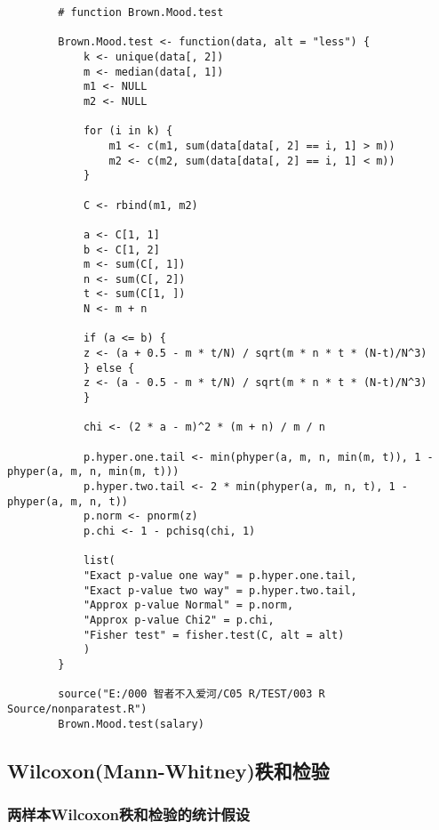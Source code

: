 \documentclass[UTF8]{ctexart}
\numberwithin{equation}{section}
\begin{document}
\begin{center}
    \begin{lstlisting}
        # function Brown.Mood.test

        Brown.Mood.test <- function(data, alt = "less") {
            k <- unique(data[, 2])
            m <- median(data[, 1])
            m1 <- NULL
            m2 <- NULL
        
            for (i in k) {
                m1 <- c(m1, sum(data[data[, 2] == i, 1] > m))
                m2 <- c(m2, sum(data[data[, 2] == i, 1] < m))
            }
        
            C <- rbind(m1, m2)
        
            a <- C[1, 1]
            b <- C[1, 2]
            m <- sum(C[, 1])
            n <- sum(C[, 2])
            t <- sum(C[1, ])
            N <- m + n
        
            if (a <= b) {
            z <- (a + 0.5 - m * t/N) / sqrt(m * n * t * (N-t)/N^3)
            } else {
            z <- (a - 0.5 - m * t/N) / sqrt(m * n * t * (N-t)/N^3)
            }
        
            chi <- (2 * a - m)^2 * (m + n) / m / n
            
            p.hyper.one.tail <- min(phyper(a, m, n, min(m, t)), 1 - phyper(a, m, n, min(m, t)))
            p.hyper.two.tail <- 2 * min(phyper(a, m, n, t), 1 - phyper(a, m, n, t))
            p.norm <- pnorm(z)
            p.chi <- 1 - pchisq(chi, 1)
            
            list(
            "Exact p-value one way" = p.hyper.one.tail, 
            "Exact p-value two way" = p.hyper.two.tail,
            "Approx p-value Normal" = p.norm, 
            "Approx p-value Chi2" = p.chi,
            "Fisher test" = fisher.test(C, alt = alt)
            )
        }
        
        source("E:/000 智者不入爱河/C05 R/TEST/003 R Source/nonparatest.R")
        Brown.Mood.test(salary)
    \end{lstlisting}
\end{center}

\subsection{Wilcoxon(Mann-Whitney)秩和检验}

\subsubsection{两样本Wilcoxon秩和检验的统计假设}
\end{document}
